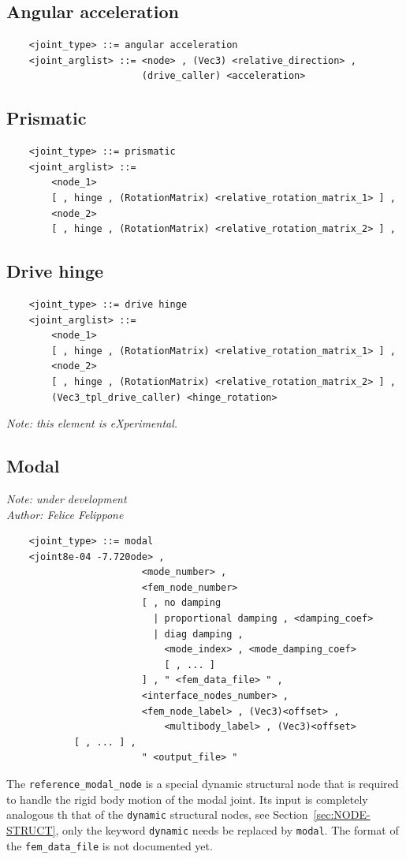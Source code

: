 \subsection{Angular acceleration}
\begin{verbatim}
    <joint_type> ::= angular acceleration
    <joint_arglist> ::= <node> , (Vec3) <relative_direction> , 
                        (drive_caller) <acceleration>
\end{verbatim}

\subsection{Prismatic}
\begin{verbatim}
    <joint_type> ::= prismatic
    <joint_arglist> ::= 
        <node_1>
        [ , hinge , (RotationMatrix) <relative_rotation_matrix_1> ] ,
        <node_2> 
        [ , hinge , (RotationMatrix) <relative_rotation_matrix_2> ] ,    
\end{verbatim}

\subsection{Drive hinge}
\begin{verbatim}
    <joint_type> ::= drive hinge
    <joint_arglist> ::= 
        <node_1>
        [ , hinge , (RotationMatrix) <relative_rotation_matrix_1> ] ,
        <node_2> 
        [ , hinge , (RotationMatrix) <relative_rotation_matrix_2> ] ,
        (Vec3_tpl_drive_caller) <hinge_rotation>
\end{verbatim}
{\em
    Note: this element is eXperimental. 
}
  
\subsection{Modal}\label{ELEMS-JOINT-MODAL}
{\em 
    Note: under development \\
    Author: Felice Felippone
}
\begin{verbatim}
    <joint_type> ::= modal
    <joint                    8e-04 -7.720ode> ,
                        <mode_number> ,
                        <fem_node_number> 
                        [ , no damping 
                          | proportional damping , <damping_coef>
                          | diag damping , 
                            <mode_index> , <mode_damping_coef> 
                            [ , ... ] 
                        ] , " <fem_data_file> " ,
                        <interface_nodes_number> ,
                        <fem_node_label> , (Vec3)<offset> ,
                            <multibody_label> , (Vec3)<offset>
			[ , ... ] ,
                        " <output_file> "
\end{verbatim}
The \texttt{reference\_modal\_node} is a special dynamic structural node that
is required to handle the rigid body motion of the modal joint.
Its input is completely analogous th that of the \texttt{dynamic} structural
nodes, see Section~\ref{sec:NODE-STRUCT}, only the keyword \texttt{dynamic} 
needs be replaced by \texttt{modal}.
The format of the \texttt{fem\_data\_file} is not documented yet.




